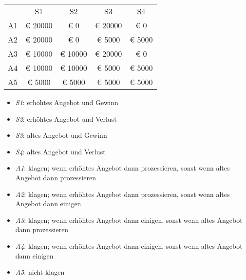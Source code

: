 \begin{tabular}{c|c|c|c|c|}
\multicolumn{1}{c}{}  & \multicolumn{1}{c}{S1}  & \multicolumn{1}{c}{S2}  & \multicolumn{1}{c}{S3}  & \multicolumn{1}{c}{S4} \\ \cline{2-5}
 A1 & € 20000 & € 0 & € 20000 & € 0 \\ \cline{2-5}
 A2 & € 20000 & € 0 & € 5000 & € 5000 \\ \cline{2-5}
 A3 & € 10000 & € 10000 & € 20000 & € 0 \\ \cline{2-5}
 A4 & € 10000 & € 10000 & € 5000 & € 5000 \\ \cline{2-5}
 A5 & € 5000 & € 5000 & € 5000 & € 5000 \\ \cline{2-5}
\end{tabular}
\begin{itemize}
\item {\em S1}: erhöhtes Angebot und Gewinn
\item {\em S2}: erhöhtes Angebot und Verlust
\item {\em S3}: altes Angebot und Gewinn
\item {\em S4}: altes Angebot und Verlust
\end{itemize}
\begin{itemize}
\item {\em A1}: klagen;  wenn erhöhtes Angebot dann prozessieren,  sonst wenn altes Angebot dann prozessieren
\item {\em A2}: klagen;  wenn erhöhtes Angebot dann prozessieren,  sonst wenn altes Angebot dann einigen
\item {\em A3}: klagen;  wenn erhöhtes Angebot dann einigen,  sonst wenn altes Angebot dann prozessieren
\item {\em A4}: klagen;  wenn erhöhtes Angebot dann einigen,  sonst wenn altes Angebot dann einigen
\item {\em A5}: nicht klagen
\end{itemize}
